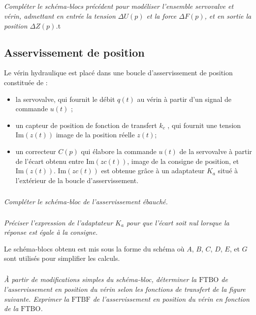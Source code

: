\documentclass[10pt,fleqn]{article} %
\begin{document}
\begin{multicols}{2}
\subparagraph{}\textit{Compléter le schéma-blocs précédent pour modéliser l’ensemble servovalve et vérin, admettant
en entrée la tension $\Delta U(p)$ et la force $\Delta F(p)$, et en sortie la position $\Delta Z(p)$.}t
\ifprof
\begin{corrige}
\end{corrige}
\else
\fi

\subsection*{Asservissement de position}

Le vérin hydraulique est placé dans une boucle d’asservissement de position constituée de :
\begin{itemize}
\item la servovalve, qui fournit le débit $q(t )$ au vérin à partir d’un signal de commande $u(t)$ ;
\item un capteur de position de fonction de transfert $k_c$ , qui fournit une tension $\text{Im}(z (t ))$ image
de la position réelle $z (t )$;
\item un correcteur $C(p)$ qui élabore la commande $u(t )$ de la servovalve à partir de l’écart obtenu
entre $\text{Im}(z c (t ))$, image de la consigne de position, et $\text{Im}(z (t ))$.
$\text{Im}(zc (t ))$ est obtenue grâce à un adaptateur $K_a$ situé à l’extérieur de la boucle d’asservissement.
\end{itemize}


\subparagraph{}\textit{Compléter le schéma-bloc de l’asservissement ébauché.}
\ifprof
\begin{corrige}
\end{corrige}
\else
\fi

\subparagraph{}\textit{Préciser l’expression de l’adaptateur $K_a$ pour que l’écart soit nul lorsque la réponse est égale
à la consigne.}
\ifprof
\begin{corrige}
\end{corrige}
\else
\fi


Le schéma-blocs obtenu est mis sous la forme du schéma  où $A$, $B$, $C$, $D$, $E$, et $G$
sont utilisés pour simplifier les calculs.

\subparagraph{}\textit{À partir de modifications simples du schéma-bloc, déterminer la $\text{FTBO}$ de l’asservissement
en position du vérin selon les fonctions de transfert de la figure suivante. Exprimer la $\text{FTBF}$ de
l’asservissement en position du vérin en fonction de la $\text{FTBO}$.}
\ifprof
\begin{corrige}
\end{corrige}
\else
\fi



\end{multicols}
\end{document}
